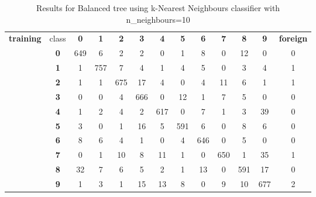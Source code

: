 \begin{table}[htp]
	\centering
	\caption{Results for Balanced tree using k-Nearest Neighbours classifier with n\_neighbours=10}
	\label{balanced_tree_knn_results}
	\begin{tabular}{|c|c|c|c|c|c|c|c|c|c|c|c|c|}
		\hline
		\multirow{11}{*}{\textbf{training}} & class      & \textbf{0} & \textbf{1} & \textbf{2} & \textbf{3} & \textbf{4} & \textbf{5} & \textbf{6} & \textbf{7} & \textbf{8} & \textbf{9} & \textbf{foreign} \\ \cline{2-13} 
		& \textbf{0} & 649        & 6          & 2          & 2          & 0          & 1          & 8          & 0          & 12         & 0          & 0                \\ \cline{2-13} 
		& \textbf{1} & 1          & 757        & 7          & 4          & 1          & 4          & 5          & 0          & 3          & 4          & 1                \\ \cline{2-13} 
		& \textbf{2} & 1          & 1          & 675        & 17         & 4          & 0          & 4          & 11         & 6          & 1          & 1                \\ \cline{2-13} 
		& \textbf{3} & 0          & 0          & 4          & 666        & 0          & 12         & 1          & 7          & 5          & 0          & 0                \\ \cline{2-13} 
		& \textbf{4} & 1          & 2          & 4          & 2          & 617        & 0          & 7          & 1          & 3          & 39         & 0                \\ \cline{2-13} 
		& \textbf{5} & 3          & 0          & 1          & 16         & 5          & 591        & 6          & 0          & 8          & 6          & 0                \\ \cline{2-13} 
		& \textbf{6} & 8          & 6          & 4          & 1          & 0          & 4          & 646        & 0          & 5          & 0          & 0                \\ \cline{2-13} 
		& \textbf{7} & 0          & 1          & 10         & 8          & 11         & 1          & 0          & 650        & 1          & 35         & 1                \\ \cline{2-13} 
		& \textbf{8} & 32         & 7          & 6          & 5          & 2          & 1          & 13         & 0          & 591        & 17         & 0                \\ \cline{2-13} 
		& \textbf{9} & 1          & 3          & 1          & 15         & 13         & 8          & 0          & 9          & 10         & 677        & 2                \\ \hline

\end{tabular}
\end{table}
